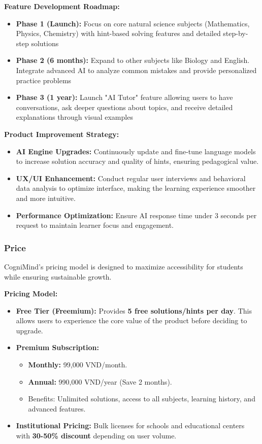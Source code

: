 \textbf{Feature Development Roadmap:}
\begin{itemize}
    \item \textbf{Phase 1 (Launch):}
        Focus on core natural science subjects (Mathematics, Physics, Chemistry) with hint-based solving features and
        detailed step-by-step solutions
    \item \textbf{Phase 2 (6 months):}
        Expand to other subjects like Biology and English. Integrate advanced AI to analyze common mistakes and provide
        personalized practice problems
    \item \textbf{Phase 3 (1 year):}
        Launch "AI Tutor" feature allowing users to have conversations, ask deeper questions about topics, and receive
        detailed explanations through visual examples
\end{itemize}

\textbf{Product Improvement Strategy:}
\begin{itemize}
    \item \textbf{AI Engine Upgrades:}
        Continuously update and fine-tune language models to increase solution accuracy and quality of hints, ensuring
        pedagogical value.
    \item \textbf{UX/UI Enhancement:}
        Conduct regular user interviews and behavioral data analysis to optimize interface, making the learning experience
        smoother and more intuitive.
    \item \textbf{Performance Optimization:}
        Ensure AI response time under 3 seconds per request to maintain learner focus and engagement.
\end{itemize}

\subsubsection{Price}
CogniMind's pricing model is designed to maximize accessibility for students while ensuring sustainable growth.

\textbf{Pricing Model:}
\begin{itemize}
    \item \textbf{Free Tier (Freemium):}
        Provides \textbf{5 free solutions/hints per day}. This allows users to experience the core value of the product
        before deciding to upgrade.
    \item \textbf{Premium Subscription:}
    \begin{itemize}
        \item \textbf{Monthly:} 99,000 VND/month.
        \item \textbf{Annual:} 990,000 VND/year (Save 2 months).
        \item Benefits: Unlimited solutions, access to all subjects, learning history, and advanced features.
    \end{itemize}
    \item \textbf{Institutional Pricing:}
        Bulk licenses for schools and educational centers with \textbf{30-50\% discount} depending on user volume.
\end{itemize}

